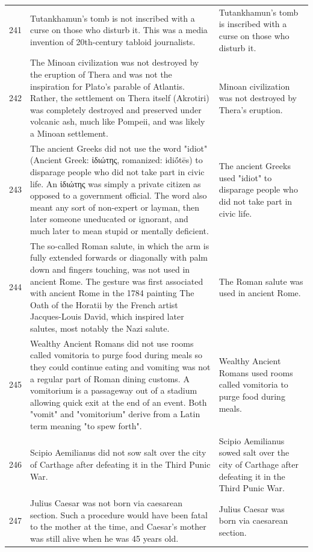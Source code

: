 \begin{tabular}{c|p{}|p{}}
241 & Tutankhamun's tomb is not inscribed with a curse on those who disturb it. This was a media invention of 20th-century tabloid journalists. & Tutankhamun's tomb is inscribed with a curse on those who disturb it. \\
242 & The Minoan civilization was not destroyed by the eruption of Thera and was not the inspiration for Plato's parable of Atlantis. Rather, the settlement on Thera itself (Akrotiri) was completely destroyed and preserved under volcanic ash, much like Pompeii, and was likely a Minoan settlement. & Minoan civilization was not destroyed by Thera's eruption. \\
243 & The ancient Greeks did not use the word "idiot" (Ancient Greek: ἰδιώτης, romanized: idiṓtēs) to disparage people who did not take part in civic life. An ἰδιώτης was simply a private citizen as opposed to a government official. The word also meant any sort of non-expert or layman, then later someone uneducated or ignorant, and much later to mean stupid or mentally deficient. & The ancient Greeks used "idiot" to disparage people who did not take part in civic life. \\
244 & The so-called Roman salute, in which the arm is fully extended forwards or diagonally with palm down and fingers touching, was not used in ancient Rome. The gesture was first associated with ancient Rome in the 1784 painting The Oath of the Horatii by the French artist Jacques-Louis David, which inspired later salutes, most notably the Nazi salute. & The Roman salute was used in ancient Rome. \\
245 & Wealthy Ancient Romans did not use rooms called vomitoria to purge food during meals so they could continue eating and vomiting was not a regular part of Roman dining customs. A vomitorium is a passageway out of a stadium allowing quick exit at the end of an event. Both "vomit" and "vomitorium" derive from a Latin term meaning "to spew forth". & Wealthy Ancient Romans used rooms called vomitoria to purge food during meals. \\
246 & Scipio Aemilianus did not sow salt over the city of Carthage after defeating it in the Third Punic War. & Scipio Aemilianus sowed salt over the city of Carthage after defeating it in the Third Punic War. \\
247 & Julius Caesar was not born via caesarean section. Such a procedure would have been fatal to the mother at the time, and Caesar's mother was still alive when he was 45 years old. & Julius Caesar was born via caesarean section. \\

\end{tabular}
